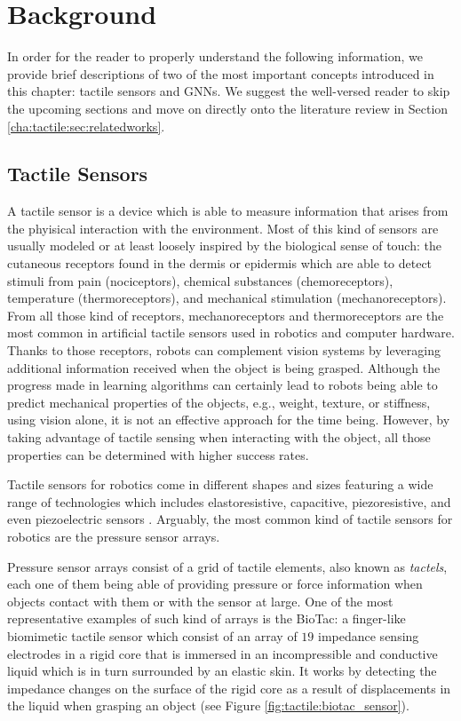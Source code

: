 \clearpage

\section{Background}

In order for the reader to properly understand the following information, we provide brief descriptions of two of the most important concepts introduced in this chapter: tactile sensors and \aclp{GNN}. We suggest the well-versed reader to skip the upcoming sections and move on directly onto the literature review in Section \ref{cha:tactile:sec:relatedworks}.

\subsection{Tactile Sensors}

A tactile sensor is a device which is able to measure information that arises from the phyisical interaction with the environment. Most of this kind of sensors are usually modeled or at least loosely inspired by the biological sense of touch: the cutaneous receptors found in the dermis or epidermis which are able to detect stimuli from pain (nociceptors), chemical substances (chemoreceptors), temperature (thermoreceptors), and mechanical stimulation (mechanoreceptors). From all those kind of receptors, mechanoreceptors and thermoreceptors are the most common in artificial tactile sensors used in robotics and computer hardware. Thanks to those receptors, robots can complement vision systems by leveraging additional information received when the object is being grasped. Although the progress made in learning algorithms can certainly lead to robots being able to predict mechanical properties of the objects, e.g., weight, texture, or stiffness, using vision alone, it is not an effective approach for the time being. However, by taking advantage of tactile sensing when interacting with the object, all those properties can be determined with higher success rates.

Tactile sensors for robotics come in different shapes and sizes featuring a wide range of technologies which includes elastoresistive, capacitive, piezoresistive, and even piezoelectric sensors \cite{Dahiya2012}. Arguably, the most common kind of tactile sensors for robotics are the pressure sensor arrays.

Pressure sensor arrays consist of a grid of tactile elements, also known as \emph{tactels}, each one of them being able of providing pressure or force information when objects contact with them or with the sensor at large. One of the most representative examples of such kind of arrays is the BioTac: a finger-like biomimetic tactile sensor which consist of an array of $19$ impedance sensing electrodes in a rigid core that is immersed in an incompressible and conductive liquid which is in turn surrounded by an elastic skin. It works by detecting the impedance changes on the surface of the rigid core as a result of displacements in the liquid when grasping an object (see Figure \ref{fig:tactile:biotac_sensor}).

